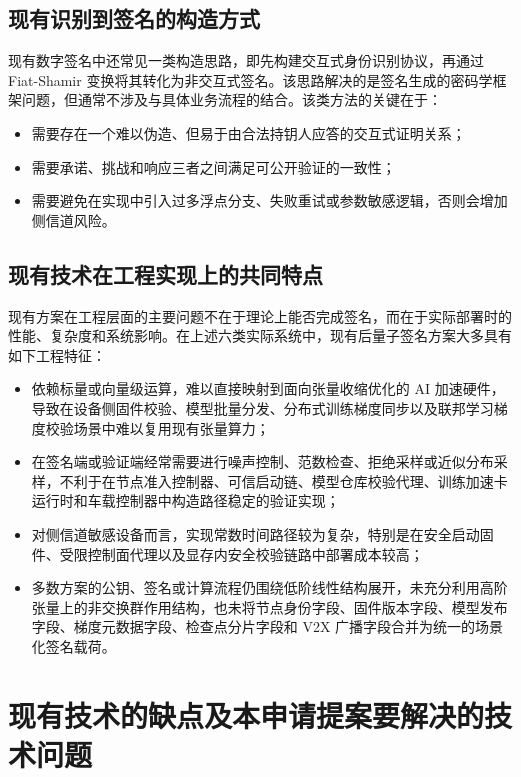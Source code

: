 \documentclass[12pt,a4paper]{article}
\begin{document}
\subsection{现有识别到签名的构造方式}

现有数字签名中还常见一类构造思路，即先构建交互式身份识别协议，再通过 Fiat-Shamir 变换将其转化为非交互式签名。该思路解决的是签名生成的密码学框架问题，但通常不涉及与具体业务流程的结合。该类方法的关键在于：

\begin{itemize}
    \item 需要存在一个难以伪造、但易于由合法持钥人应答的交互式证明关系；
    \item 需要承诺、挑战和响应三者之间满足可公开验证的一致性；
    \item 需要避免在实现中引入过多浮点分支、失败重试或参数敏感逻辑，否则会增加侧信道风险。
\end{itemize}

\subsection{现有技术在工程实现上的共同特点}

现有方案在工程层面的主要问题不在于理论上能否完成签名，而在于实际部署时的性能、复杂度和系统影响。在上述六类实际系统中，现有后量子签名方案大多具有如下工程特征：

\begin{itemize}
    \item 依赖标量或向量级运算，难以直接映射到面向张量收缩优化的 AI 加速硬件，导致在设备侧固件校验、模型批量分发、分布式训练梯度同步以及联邦学习梯度校验场景中难以复用现有张量算力；
    \item 在签名端或验证端经常需要进行噪声控制、范数检查、拒绝采样或近似分布采样，不利于在节点准入控制器、可信启动链、模型仓库校验代理、训练加速卡运行时和车载控制器中构造路径稳定的验证实现；
    \item 对侧信道敏感设备而言，实现常数时间路径较为复杂，特别是在安全启动固件、受限控制面代理以及显存内安全校验链路中部署成本较高；
    \item 多数方案的公钥、签名或计算流程仍围绕低阶线性结构展开，未充分利用高阶张量上的非交换群作用结构，也未将节点身份字段、固件版本字段、模型发布字段、梯度元数据字段、检查点分片字段和 V2X 广播字段合并为统一的场景化签名载荷。
\end{itemize}

\section{现有技术的缺点及本申请提案要解决的技术问题}
\end{document}
